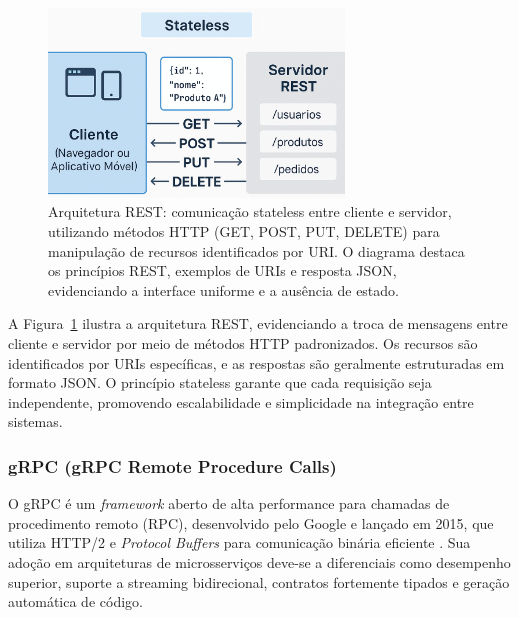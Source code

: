 \begin{figure}[H]
    \centering
    \includegraphics[width=0.7\textwidth]{images/rest.png}
    \caption{Arquitetura REST: comunicação stateless entre cliente e servidor, utilizando métodos HTTP (GET, POST, PUT, DELETE) para manipulação de recursos identificados por URI. O diagrama destaca os princípios REST, exemplos de URIs e resposta JSON, evidenciando a interface uniforme e a ausência de estado.}
    \label{fig:rest-arquitetura}
\end{figure}

A Figura~\ref{fig:rest-arquitetura} ilustra a arquitetura REST, evidenciando a troca de mensagens entre cliente e servidor por meio de métodos HTTP padronizados. Os recursos são identificados por URIs específicas, e as respostas são geralmente estruturadas em formato JSON. O princípio stateless garante que cada requisição seja independente, promovendo escalabilidade e simplicidade na integração entre sistemas.

\subsubsection{gRPC (gRPC Remote Procedure Calls)}

O \gls{gRPC} é um \textit{framework} aberto de alta performance para chamadas de procedimento remoto (RPC), desenvolvido pelo Google e lançado em 2015, que utiliza \gls{HTTP/2} e \textit{Protocol Buffers} para comunicação binária eficiente \cite{niswar2023performance, maso2024comparativo}. Sua adoção em arquiteturas de microsserviços deve-se a diferenciais como desempenho superior, suporte a streaming bidirecional, contratos fortemente tipados e geração automática de código.

